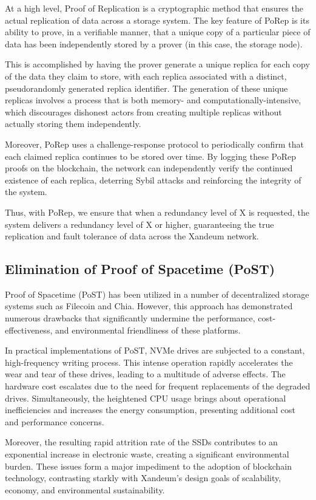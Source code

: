 \documentclass[11pt]{article}   	%
\begin{document}
At a high level, Proof of Replication is a cryptographic method that ensures the actual replication of data across a storage system. The key feature of PoRep is its ability to prove, in a verifiable manner, that a unique copy of a particular piece of data has been independently stored by a prover (in this case, the storage node).

This is accomplished by having the prover generate a unique replica for each copy of the data they claim to store, with each replica associated with a distinct, pseudorandomly generated replica identifier. The generation of these unique replicas involves a process that is both memory- and computationally-intensive, which discourages dishonest actors from creating multiple replicas without actually storing them independently.

Moreover, PoRep uses a challenge-response protocol to periodically confirm that each claimed replica continues to be stored over time. By logging these PoRep proofs on the blockchain, the network can independently verify the continued existence of each replica, deterring Sybil attacks and reinforcing the integrity of the system.

Thus, with PoRep, we ensure that when a redundancy level of X is requested, the system delivers a redundancy level of X or higher, guaranteeing the true replication and fault tolerance of data across the Xandeum network.

\subsection{Elimination of Proof of Spacetime (PoST)}
Proof of Spacetime (PoST) has been utilized in a number of decentralized storage systems such as Filecoin and Chia. However, this approach has demonstrated numerous drawbacks that significantly undermine the performance, cost-effectiveness, and environmental friendliness of these platforms.

In practical implementations of PoST, NVMe drives are subjected to a constant, high-frequency writing process. This intense operation rapidly accelerates the wear and tear of these drives, leading to a multitude of adverse effects. The hardware cost escalates due to the need for frequent replacements of the degraded drives. Simultaneously, the heightened CPU usage brings about operational inefficiencies and increases the energy consumption, presenting additional cost and performance concerns.

Moreover, the resulting rapid attrition rate of the SSDs contributes to an exponential increase in electronic waste, creating a significant environmental burden. These issues form a major impediment to the adoption of blockchain technology, contrasting starkly with Xandeum's design goals of scalability, economy, and environmental sustainability.
\end{document}
